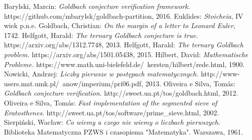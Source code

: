 \documentclass[10pt,onecolumn]{article}
\theoremstyle{definition}
\theoremstyle{hypothesis}
\theoremstyle{capability}
\begin{document}
\newpage


\begin{thebibliography}{9}

  Barylski, Marcin:
  \emph{Goldbach conjecture verification framework.}
  https://github.com/mbarylsk/goldbach-partition,
  2016.
  Euklides:
  \emph{Stoicheia},
  IV wiek p.n.e.
  Goldbach, Christian:
  \emph{On the margin of a letter to Leonard Euler},
  1742.
   Helfgott, Harald:
  \emph{The ternary Goldbach conjecture is true.}
  https://arxiv.org/abs/1312.7748,
  2013.
   Helfgott, Harald:
  \emph{The ternary Goldbach problem.}
  https://arxiv.org/abs/1501.05438,
  2015.
   Hilbert, David:
  \emph{Mathematische Probleme.}
  https://www.math.uni-bielefeld.de/~kersten/hilbert/rede.html,
  1900.
   Nowicki, Andrzej:
  \emph{Liczby pierwsze w postępach matematycznych.}
  http://www-users.mat.umk.pl/~anow/imperium/pri06.pdf,
  2013.
   Oliveira e Silva, Tomás:
  \emph{Goldbach conjecture verification.}
  http://sweet.ua.pt/tos/goldbach.html,
  2012.
  Oliveira e Silva, Tomás:
  \emph{Fast implementation of the segmented sieve of Eratosthenes.}
  http://sweet.ua.pt/tos/software/prime\_sieve.html,
  2002.
  Sierpiński, Wacław: 
  \emph{Co wiemy a czego nie wiemy o liczbach pierwszych.}
  Biblioteka Matematyczna PZWS i czasopisma "Matematyka". Warszawa, 1961.

\end{thebibliography}
\end{document}
